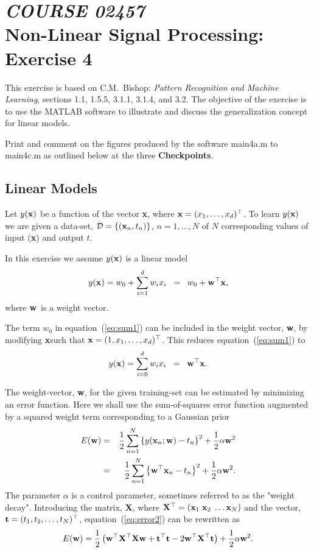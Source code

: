 \documentclass[times,12pt]{article}    %
\def\x{{\bf x}}
\def\X{{\bf X}}
\def\w{{\bf w}}
\def\t{{\bf t}}
\def\D{\mathcal{D}}
\begin{document}
\section*{{\it COURSE 02457}\\[5mm] Non-Linear Signal Processing: Exercise 4}

This exercise is based on C.M.\ Bishop: {\it Pattern Recognition
and Machine Learning}, sections 1.1, 1.5.5, 3.1.1, 3.1.4, and 3.2.
The objective of the exercise is to use the MATLAB software to
illustrate and discuss the generalization concept for linear models.

Print and comment on the figures produced by the software {\sf
 main4a.m} to {\sf main4c.m} as outlined below at the three {\bf
 Checkpoints}.


\subsection*{Linear Models}
Let $y(\x)$ be a function of the vector \x, where
$\x=(x_1,\ldots,x_d)^\top$. To learn $y(\x)$  we are given a data-set, $\D = \left\{ (\x_n,t_n) \right\}$, $
n=1,\ldots,N$ of $N$ corresponding values of input (\x) and output $t$.

In this exercise we assume $y(\x)$ is a linear model
\begin{equation}
  \label{eq:sum1}
  y(\x) = w_0 + \sum_{i=1}^d w_i x_i \;\; = \;\; w_0 + \w^\top \x,
\end{equation}
where \w\ is a weight vector.

The term $w_0$ in equation~(\ref{eq:sum1}) can be included in the
weight vector, \w, by modifying \x such that
$\x=(1,x_1,\ldots,x_d)^\top$. This reduces equation~(\ref{eq:sum1}) to
\begin{equation}
  \label{eq:sum2}
  y(\x) = \sum_{i=0}^d w_i x_i \;\; = \;\; \w^\top \x.
\end{equation}

The weight-vector, \w, for the given training-set
can be estimated by minimizing an error function. Here we shall use the
sum-of-squares error function augmented by a squared weight term corresponding to a Gaussian prior 
\begin{eqnarray}
  \label{eq:error1}
  E(\w) &=& \frac{1}{2} \sum_{n=1}^N \left\{ y(\x_n;\w)-t_n \right\}^2 + \frac{1}{2}\alpha\w^2 \\
  \label{eq:error2}
       &=&  \frac{1}{2} \sum_{n=1}^N \left\{ \w^\top\x_n -t_n  \right\}^2 + \frac{1}{2}\alpha\w^2.
\end{eqnarray}
The parameter $\alpha$ is a control parameter, sometimes referred to as the "weight decay".
Introducing the matrix, \X, where $\X^\top=(\x_1\; \x_2\; \ldots
\x_N)$ and the vector, $\t = (t_1, t_2,\ldots, t_N)^\top$,
equation~(\ref{eq:error2}) can be rewritten as
\begin{equation}
  \label{eq:error3}
  E(\w) = \frac{1}{2} \left( \w^\top \X^\top \X \w + \t^\top \t -
  2\w^\top \X^\top \t  \right) + \frac{1}{2}\alpha\w^2.
\end{equation}
\end{document}
